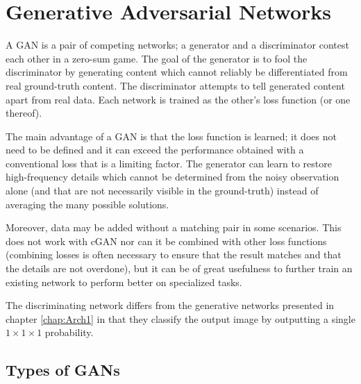 \chapter{Generative Adversarial Networks}\label{chap:Arch2}

A \acl{GAN} is a pair of competing networks; a generator and a discriminator contest each other in a zero-sum game. The goal of the generator is to fool the discriminator by generating content which cannot reliably be differentiated from real ground-truth content. The discriminator attempts to tell generated content apart from real data. Each network is trained as the other's loss function (or one thereof).

The main advantage of a \acl{GAN} is that the loss function is learned; it does not need to be defined and it can exceed the performance obtained with a conventional loss that is a limiting factor. The generator can learn to restore high-frequency details which cannot be determined from the noisy observation alone (and that are not necessarily visible in the ground-truth) instead of averaging the many possible solutions.

Moreover, data may be added without a matching pair in some scenarios. This does not work with \acl{cGAN} nor can it be combined with other loss functions (combining losses is often necessary to ensure that the result matches and that the details are not overdone), but it can be of great usefulness to further train an existing network to perform better on specialized tasks.

The discriminating network differs from the generative networks presented in chapter \ref{chap:Arch1} in that they classify the output image by outputting a single $1\times 1 \times 1$ probability.

\section{Types of GANs}

